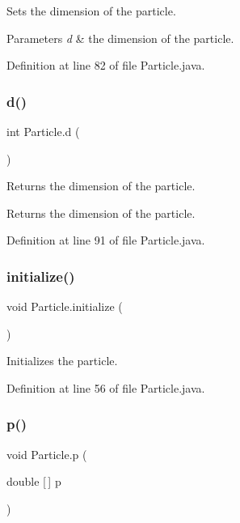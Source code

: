 Sets the dimension of the particle. 
\begin{DoxyParams}{Parameters}
{\em d} & the dimension of the particle. \\
\hline
\end{DoxyParams}


Definition at line 82 of file Particle.\+java.

\mbox{\label{class_particle_ac4efb92ddb9203e588236968d8b7b9be}} 
\subsubsection{\texorpdfstring{d()}{d()}\hspace{0.1cm}{\footnotesize\ttfamily [2/2]}}
{\footnotesize\ttfamily int Particle.\+d (\begin{DoxyParamCaption}{ }\end{DoxyParamCaption})}

Returns the dimension of the particle. \begin{DoxyReturn}{Returns}
the dimension of the particle. 
\end{DoxyReturn}


Definition at line 91 of file Particle.\+java.

\mbox{\label{class_particle_a99f82d52c6e3e0454db2607f768f8cb3}} 
\subsubsection{\texorpdfstring{initialize()}{initialize()}}
{\footnotesize\ttfamily void Particle.\+initialize (\begin{DoxyParamCaption}{ }\end{DoxyParamCaption})}

Initializes the particle. 

Definition at line 56 of file Particle.\+java.

\mbox{\label{class_particle_af3cd850d81af82f5357492136c7679ab}} 
\subsubsection{\texorpdfstring{p()}{p()}\hspace{0.1cm}{\footnotesize\ttfamily [1/3]}}
{\footnotesize\ttfamily void Particle.\+p (\begin{DoxyParamCaption}\item[{double \mbox{[}$\,$\mbox{]}}]{p }\end{DoxyParamCaption})}

